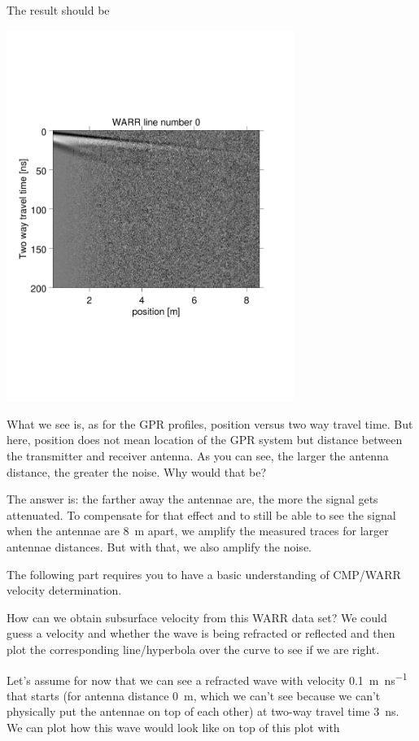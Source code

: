 \documentclass[11pt]{article}
\begin{document}
The result should be
\begin{center}
\includegraphics[width=0.7\textwidth, trim = 0.9cm 6cm 2cm
  6.5cm,clip]{figures/WARR}
\end{center}
 
What we see is, as for the GPR profiles, position versus two way
travel time. But here, position does not mean location of the GPR
system but distance between the transmitter and receiver antenna. As
you can see, the larger the antenna distance, the greater the
noise. Why would that be?
 
The answer is: the farther away the antennae are, the more the signal
gets attenuated. To compensate for that effect and to still be able to
see the signal when the antennae are \SI{8}{m} apart, we amplify the
measured traces for larger antennae distances. But with that, we also
amplify the noise.
 
The following part requires you to have a basic understanding of
CMP/WARR velocity determination. 
 
How can we obtain subsurface velocity from this WARR data set? We
could guess a velocity and whether the wave is being refracted or
reflected and then plot the corresponding line/hyperbola over the
curve to see if we are right.
 
Let's assume for now that we can see a refracted wave with velocity
\SI{0.1}{m\per\ns} that starts (for antenna distance \SI{0}{m}, which
we can't see because we can't physically put the antennae on top of
each other) at two-way travel time \SI{3}{\ns}. We can plot how this wave
would look like on top of this plot with
 
\end{document}
